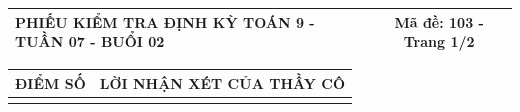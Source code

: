 \documentclass[12pt,a4paper]{article}
\begin{document}
\newpage

\noindent
\begin{tabularx}{\linewidth}{|X|c|}
\hline
\textbf{PHIẾU KIỂM TRA ĐỊNH KỲ TOÁN 9 - TUẦN 07 - BUỔI 02} & \textbf{Mã đề: 103 - Trang 1/2} \\
\hline
\end{tabularx}

\vspace{1.0mm}

\noindent
\begin{tabularx}{\linewidth}{|p{3.2cm}|X|}
\hline
\centering\textbf{ĐIỂM SỐ} & \centering\textbf{LỜI NHẬN XÉT CỦA THẦY CÔ} \tabularnewline
\hline
\rule{0pt}{1.8cm} & \tabularnewline
\hline
\end{tabularx}
\end{document}
